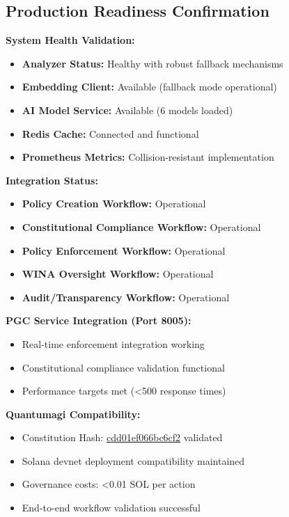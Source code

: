 \subsection{Production Readiness Confirmation}

\textbf{System Health Validation:}
\begin{itemize}[leftmargin=*,topsep=2pt,itemsep=2pt,parsep=0pt]
    \item \checkmarkcustom{} \textbf{Analyzer Status:} Healthy with robust fallback mechanisms
    \item \checkmarkcustom{} \textbf{Embedding Client:} Available (fallback mode operational)
    \item \checkmarkcustom{} \textbf{AI Model Service:} Available (6 models loaded)
    \item \checkmarkcustom{} \textbf{Redis Cache:} Connected and functional
    \item \checkmarkcustom{} \textbf{Prometheus Metrics:} Collision-resistant implementation
\end{itemize}

\textbf{Integration Status:}
\begin{itemize}[leftmargin=*,topsep=2pt,itemsep=2pt,parsep=0pt]
    \item \checkmarkcustom{} \textbf{Policy Creation Workflow:} Operational
    \item \checkmarkcustom{} \textbf{Constitutional Compliance Workflow:} Operational
    \item \checkmarkcustom{} \textbf{Policy Enforcement Workflow:} Operational
    \item \checkmarkcustom{} \textbf{WINA Oversight Workflow:} Operational
    \item \checkmarkcustom{} \textbf{Audit/Transparency Workflow:} Operational
\end{itemize}

\textbf{PGC Service Integration (Port 8005):}
\begin{itemize}[leftmargin=*,topsep=2pt,itemsep=2pt,parsep=0pt]
    \item \checkmarkcustom{} Real-time enforcement integration working
    \item \checkmarkcustom{} Constitutional compliance validation functional
    \item \checkmarkcustom{} Performance targets met (<500\ms{} response times)
\end{itemize}

\textbf{Quantumagi Compatibility:}
\begin{itemize}[leftmargin=*,topsep=2pt,itemsep=2pt,parsep=0pt]
    \item \checkmarkcustom{} Constitution Hash: \url{cdd01ef066bc6cf2} validated
    \item \checkmarkcustom{} Solana devnet deployment compatibility maintained
    \item \checkmarkcustom{} Governance costs: <0.01 SOL per action
    \item \checkmarkcustom{} End-to-end workflow validation successful
\end{itemize}


